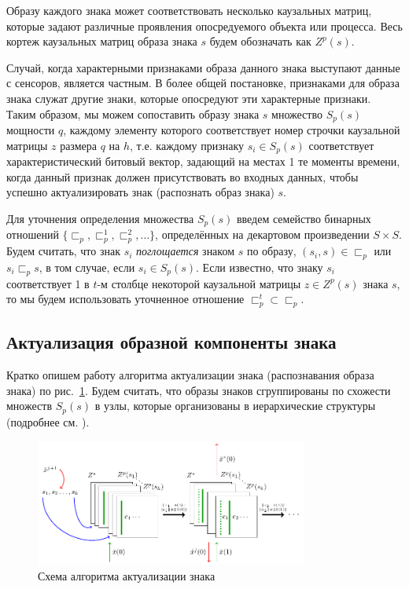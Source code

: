 \documentclass[12pt]{scrartcl}
\begin{document}
	Образу каждого знака может соответствовать несколько каузальных матриц, которые задают различные проявления опосредуемого объекта или процесса. Весь кортеж каузальных матриц образа знака $s$ будем обозначать как $Z^p(s)$. 
	
	Случай, когда характерными признаками образа данного знака выступают данные с сенсоров, является частным. В более общей постановке, признаками для образа знака служат другие знаки, которые опосредуют эти характерные признаки. Таким образом, мы можем сопоставить образу знака $s$ множество $S_p(s)$ мощности $q$, каждому элементу которого соответствует номер строчки каузальной матрицы $z$ размера $q$ на $h$, т.е. каждому признаку $s_i\in S_p(s)$ соответствует характеристический битовый вектор, задающий на местах 1 те моменты времени, когда данный признак должен присутствовать во входных данных, чтобы успешно актуализировать знак (распознать образ знака) $s$. 
	
	Для уточнения определения множества $S_p(s)$ введем семейство бинарных отношений $\{\sqsubset_p,\sqsubset_p^1,\sqsubset_p^2,\dots\}$, определённых на декартовом произведении $S\times S$. Будем считать, что знак $s_i$ \textit{поглощается} знаком $s$ по образу, $(s_i,s)\in\sqsubset_p$ или $s_i\sqsubset_p s$, в том случае, если $s_i\in S_p(s)$. Если известно, что знаку $s_i$ соответствует 1 в $t$-м столбце некоторой каузальной матрицы $z\in Z^p(s)$ знака $s$, то мы будем использовать уточненное отношение $\sqsubset_p^t\subset \sqsubset_p$.
	
	\subsection{Актуализация образной компоненты знака}
	
	Кратко опишем работу алгоритма актуализации знака (распознавания образа знака) по рис.~\ref{fig:percept}. Будем считать, что образы знаков сгруппированы по схожести множеств $S_p(s)$ в узлы, которые организованы в иерархические структуры (подробнее см. \cite{Panov2014d}).
	
	\begin{figure}
		\centering
		\includegraphics[width=0.8\textwidth]{algo/perception}
		\caption{Схема алгоритма актуализации знака}
		\label{fig:percept}		
	\end{figure}
\end{document}
